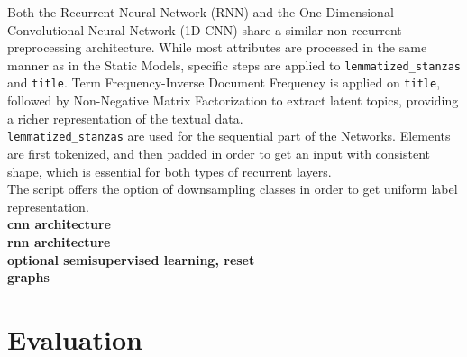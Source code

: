 Both the Recurrent Neural Network (RNN) and the One-Dimensional Convolutional
Neural Network (1D-CNN) share a similar non-recurrent preprocessing
architecture. While most attributes are processed in the same manner as in
the Static Models, specific steps are applied to \texttt{lemmatized\_stanzas}
and \texttt{title}.
Term Frequency-Inverse Document Frequency is applied on \texttt{title},
followed by Non-Negative Matrix Factorization
to extract latent topics, providing a richer representation of the
textual data.\\

\texttt{lemmatized\_stanzas} are used for the sequential part of the Networks.
Elements are first tokenized, and then padded in order to
get an input with consistent shape, which is essential for both types of
recurrent layers.\\

The script offers the option of downsampling classes in order to get
uniform label representation.\\

\textbf{cnn architecture}\\

\textbf{rnn architecture}\\

\textbf{optional semisupervised learning, reset}\\

\textbf{graphs}



\section*{Evaluation}
